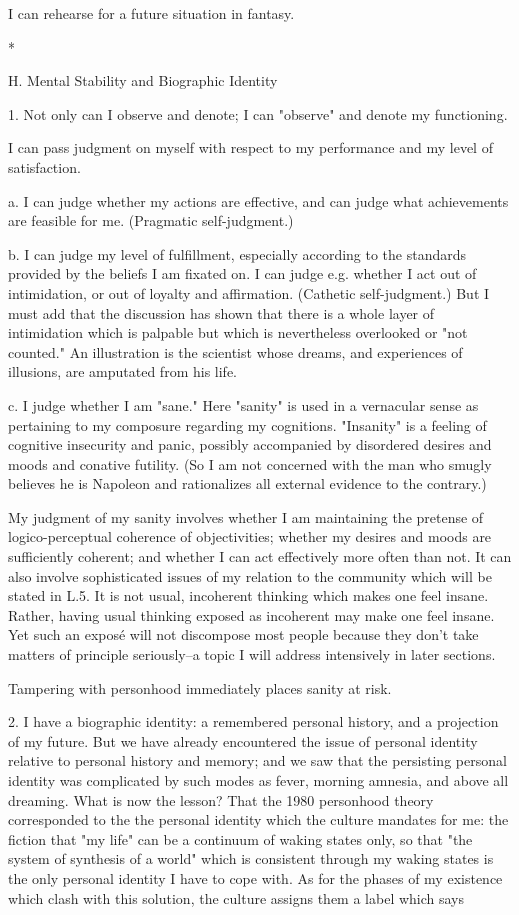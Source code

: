 I can rehearse for a future situation in fantasy.

*

H. Mental Stability and Biographic Identity

1. Not only can I observe and denote; I can "observe" and denote my functioning.

I can pass judgment on myself with respect to my performance and my level of satisfaction.

a. I can judge whether my actions are effective, and can judge what achievements are feasible for me. (Pragmatic self-judgment.)

b. I can judge my level of fulfillment, especially according to the standards provided by the beliefs I am fixated on. I can judge e.g. whether I act out of intimidation, or out of loyalty and affirmation. (Cathetic self-judgment.) But I must add that the discussion has shown that there is a whole layer of intimidation which is palpable but which is nevertheless overlooked or "not counted." An illustration is the scientist whose dreams, and experiences of illusions, are amputated from his life.

c. I judge whether I am "sane." Here "sanity" is used in a vernacular sense as pertaining to my composure regarding my cognitions. "Insanity" is a feeling of cognitive insecurity and panic, possibly accompanied by disordered desires and moods and conative futility. (So I am not concerned with the man who smugly believes he is Napoleon and rationalizes all external evidence to the contrary.)

My judgment of my sanity involves whether I am maintaining the pretense of logico-perceptual coherence of objectivities; whether my desires and moods are sufficiently coherent; and whether I can act effectively more often than not. It can also involve sophisticated issues of my relation to the community which will be stated in L.5. It is not usual, incoherent thinking which makes one feel insane. Rather, having usual thinking exposed as incoherent may make one feel insane. Yet such an exposé will not discompose most people because they don't take matters of principle seriously--a topic I will address intensively in later sections.

Tampering with personhood immediately places sanity at risk.

2. I have a biographic identity: a remembered personal history, and a projection of my future. But we have already encountered the issue of personal identity relative to personal history and memory; and we saw that the persisting personal identity was complicated by such modes as fever, morning amnesia, and above all dreaming. What is now the lesson? That the 1980 personhood theory corresponded to the the personal identity which the culture mandates for me: the fiction that "my life" can be a continuum of waking states only, so that "the system of synthesis of a world" which is consistent through my waking states is the only personal identity I have to cope with. As for the phases of my existence which clash with this solution, the culture assigns them a label which says


